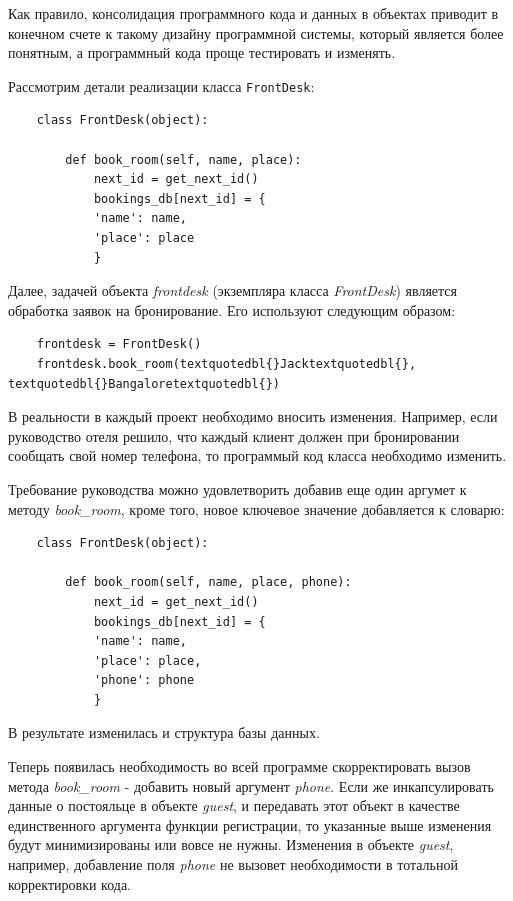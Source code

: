 \documentclass[a4paper,openany,twoside,draft]{book}
\providecommand*{\DUroletitlereference}[1]{\textsl{#1}}
\begin{document}
Как правило, консолидация программного кода и данных в объектах
приводит в конечном счете к такому дизайну программной системы,
который является более понятным, а программный кода проще тестировать
и изменять.

Рассмотрим детали реализации класса \texttt{FrontDesk}:

\begin{verbatim}
    class FrontDesk(object):

        def book_room(self, name, place):
            next_id = get_next_id()
            bookings_db[next_id] = {
            'name': name,
            'place': place
            }
\end{verbatim}

Далее, задачей объекта \DUroletitlereference{frontdesk} (экземпляра класса \DUroletitlereference{FrontDesk})
является обработка заявок на бронирование.  Его используют следующим
образом:

\begin{verbatim}
    frontdesk = FrontDesk()
    frontdesk.book_room(textquotedbl{}Jacktextquotedbl{}, textquotedbl{}Bangaloretextquotedbl{})
\end{verbatim}

В реальности в каждый проект необходимо вносить изменения.  Например,
если руководство отеля решило, что каждый клиент должен при
бронировании сообщать свой номер телефона, то программый код класса
необходимо изменить.

Требование руководства можно удовлетворить добавив еще один аргумет к
методу \DUroletitlereference{book\_room}, кроме того, новое ключевое значение добавляется к
словарю:

\begin{verbatim}
    class FrontDesk(object):

        def book_room(self, name, place, phone):
            next_id = get_next_id()
            bookings_db[next_id] = {
            'name': name,
            'place': place,
            'phone': phone
            }
\end{verbatim}

В результате изменилась и структура базы данных.

Теперь появилась необходимость во всей программе скорректировать вызов
метода \DUroletitlereference{book\_room} - добавить новый аргумент \DUroletitlereference{phone}.  Если же
инкапсулировать данные о постояльце в объекте \DUroletitlereference{guest}, и передавать
этот объект в качестве единственного аргумента функции регистрации, то
указанные выше изменения будут минимизированы или вовсе не нужны.
Изменения в объекте \DUroletitlereference{guest}, например, добавление поля \DUroletitlereference{phone} не
вызовет необходимости в тотальной корректировки кода.
\end{document}
